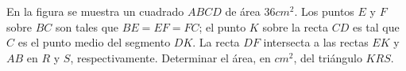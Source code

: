 En la figura se muestra un cuadrado $ABCD$ de área $36 cm^2$. Los puntos $E$ y $F$ sobre $BC$ son tales que $BE = EF = FC$; el punto $K$ sobre la recta $CD$ es tal que $C$ es el punto medio del segmento $DK$. La recta $DF$ intersecta a las rectas $EK$ y $AB$ en $R$ y $S$, respectivamente. Determinar el área, en $cm^2$, del triángulo $KRS$.